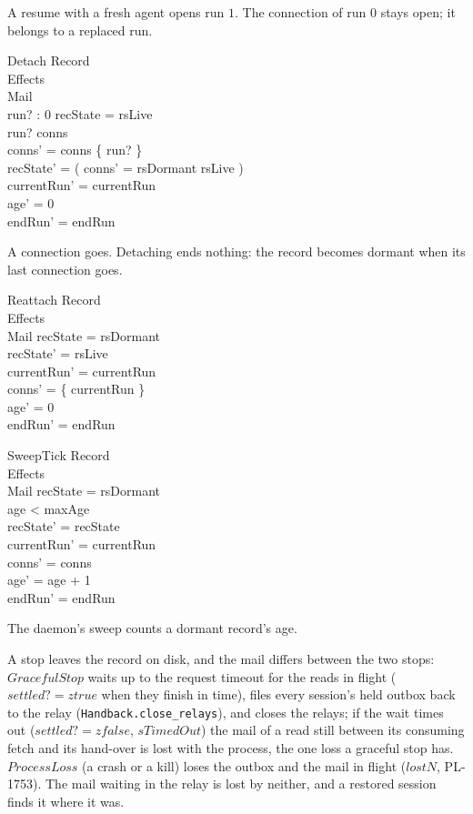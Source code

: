\documentclass[a4paper,10pt,fleqn]{article}
\begin{document}
A resume with a fresh agent opens run $1$.  The connection of run $0$ stays open;
it belongs to a replaced run.

\begin{schema}{Detach}
  \Delta Record \\
  \Xi Effects \\
  \Xi Mail \\
  run? : 0 
  \where
  recState = rsLive \\
  run? \in conns \\
  conns' = conns \setminus \{ run? \} \\
  recState' = ( \IF conns' = \emptyset \THEN rsDormant \ELSE rsLive ) \\
  currentRun' = currentRun \\
  age' = 0 \\
  endRun' = endRun
\end{schema}

A connection goes.  Detaching ends nothing: the record becomes dormant when its
last connection goes.

\begin{schema}{Reattach}
  \Delta Record \\
  \Xi Effects \\
  \Xi Mail
  \where
  recState = rsDormant \\
  recState' = rsLive \\
  currentRun' = currentRun \\
  conns' = \{ currentRun \} \\
  age' = 0 \\
  endRun' = endRun
\end{schema}

\begin{schema}{SweepTick}
  \Delta Record \\
  \Xi Effects \\
  \Xi Mail
  \where
  recState = rsDormant \\
  age < maxAge \\
  recState' = recState \\
  currentRun' = currentRun \\
  conns' = conns \\
  age' = age + 1 \\
  endRun' = endRun
\end{schema}

The daemon's sweep counts a dormant record's age.



A stop leaves the record on disk, and the mail differs between the two stops: $GracefulStop$ waits up to the
request timeout for the reads in flight ($settled? = ztrue$ when they finish in time), files every
session's held outbox back to the relay (\texttt{Handback.close\_relays}), and closes the relays; if
the wait times out ($settled? = zfalse$, $sTimedOut$) the mail of a read still between its consuming
fetch and its hand-over is lost with the process, the one loss a graceful stop has.  $ProcessLoss$ (a
crash or a kill) loses the outbox and the mail in flight ($lostN$, PL-1753).  The mail waiting in the
relay is lost by neither, and a restored session finds it where it was.
\end{document}
